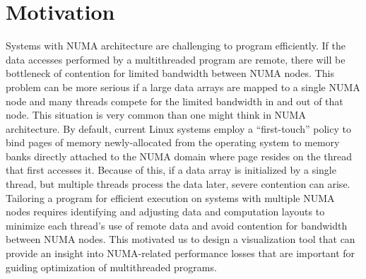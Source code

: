 \section{Motivation}
Systems with NUMA architecture are challenging to program efficiently. If the data accesses performed by a multithreaded program are remote, there will be bottleneck of contention for limited bandwidth between NUMA nodes. This problem can be more serious if a large data arrays are mapped to a single NUMA node and many threads compete for the limited bandwidth in and out of that node. This situation is very common than one might think in NUMA architecture. By default, current Linux systems employ a “first-touch” policy to bind pages of memory newly-allocated from the operating system to memory banks directly attached to the NUMA domain where page resides on the thread that first accesses it. Because of this, if a data array is initialized by a single thread, but multiple threads process the data later, severe contention can arise. Tailoring a program for efficient execution on systems with multiple NUMA nodes requires identifying and adjusting data and computation layouts to minimize each thread’s use of remote data and avoid contention for bandwidth between NUMA nodes. This motivated us to design a visualization tool that can provide an insight into NUMA-related performance losses that are important for guiding optimization of multithreaded programs.